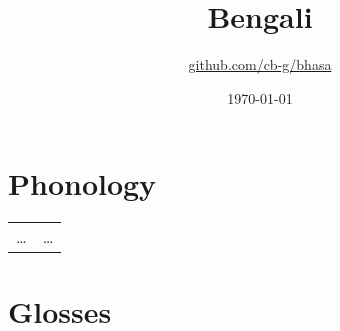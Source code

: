 \documentclass{article}
\title{Bengali\\\ipa{["baNgla]}}
\author{\href{https://github.com/cb-g/bhasa}{github.com/cb-g/bhasa}}
\date{\today}
\begin{document}
\pagecolor{custom_bg}\color{custom_fg}
\maketitle\thispagestyle{empty}

\newpage\setcounter{page}{1}\section{Phonology}

\begin{xltabular}{\textwidth}{lL}
  \dots & \dots \\
\end{xltabular}

\newpage\section{Glosses}
\end{document}
